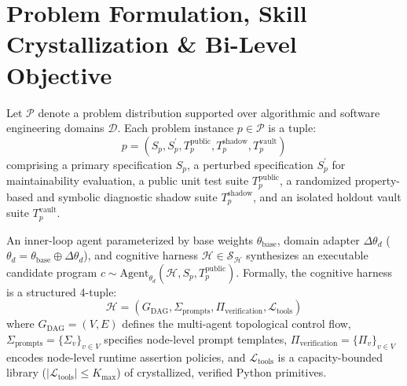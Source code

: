 \documentclass[10pt,twocolumn,letterpaper]{article}
\begin{document}
\begin{itemize}
\end{itemize}

\section{Problem Formulation, Skill Crystallization \& Bi-Level Objective}
Let $\mathcal{P}$ denote a problem distribution supported over algorithmic and software engineering domains $\mathcal{D}$. Each problem instance $p\in\mathcal{P}$ is a tuple:
\begin{equation}
p = \left(S_{p}, S_{p}^{\prime}, T_{p}^{\text{public}}, T_{p}^{\text{shadow}}, T_{p}^{\text{vault}}\right)
\end{equation}
comprising a primary specification $S_{p}$, a perturbed specification $S_{p}^{\prime}$ for maintainability evaluation, a public unit test suite $T_{p}^{\text{public}}$, a randomized property-based and symbolic diagnostic shadow suite $T_{p}^{\text{shadow}}$, and an isolated holdout vault suite $T_{p}^{\text{vault}}$.

An inner-loop agent parameterized by base weights $\theta_{\text{base}}$, domain adapter $\Delta\theta_{d}$ ($\theta_{d}=\theta_{\text{base}}\oplus\Delta\theta_{d}$), and cognitive harness $\mathcal{H}\in\mathcal{S}_{\mathcal{H}}$ synthesizes an executable candidate program $c\sim\text{Agent}_{\theta_{d}}(\mathcal{H},S_{p},T_{p}^{\text{public}})$. Formally, the cognitive harness is a structured 4-tuple:
\begin{equation}
\mathcal{H} = \left(G_{\text{DAG}}, \Sigma_{\text{prompts}}, \Pi_{\text{verification}}, \mathcal{L}_{\text{tools}}\right)
\end{equation}
where $G_{\text{DAG}}=(V,E)$ defines the multi-agent topological control flow, $\Sigma_{\text{prompts}}=\{\Sigma_{v}\}_{v\in V}$ specifies node-level prompt templates, $\Pi_{\text{verification}}=\{\Pi_{v}\}_{v\in V}$ encodes node-level runtime assertion policies, and $\mathcal{L}_{\text{tools}}$ is a capacity-bounded library ($|\mathcal{L}_{\text{tools}}|\le K_{\max}$) of crystallized, verified Python primitives.
\end{document}
